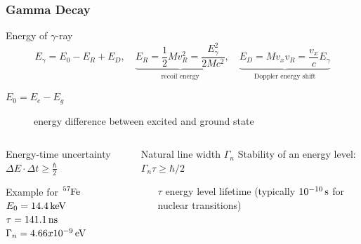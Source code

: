 	\begin{frame}
		\frametitle{Gamma Decay}
	
		\begin{block}{Energy of $\gamma$-ray}
			\fontsize{9.5pt}{12pt}
			\begin{equation*}
				E_{\gamma}=E_0-E_R+E_D, \quad \underbrace{E_R=\frac{1}{2}Mv_R^2=\frac{E_{\gamma}^2}{2Mc^2}}_{\text{recoil energy}}, \quad
				\underbrace{E_D=Mv_xv_R=\frac{v_x}{c}E_{\gamma}}_{\text{Doppler energy shift}}
			\end{equation*}
			\begin{description}
				\item [$E_0=E_e-E_g$] energy difference between excited and ground state
			\end{description}
		\end{block}
	
		\begin{columns}
			\begin{column}{0.4\linewidth}
				\begin{block}{Energy-time uncertainty}
					\centering
					$\Delta E \cdot \Delta t \geq \frac{\hbar}{2}$
				\end{block}
				\begin{block}{Example for $\ce{^{57}Fe}$}
					\centering
					$E_0=\unit[14.4]{keV}$\\
					$\tau=\unit[141.1]{ns}$\\
					$\Gamma_n=\unit[4.66 x 10^{-9}]{eV}$
				\end{block}
			\end{column}
			\begin{column}{0.55\linewidth}
				\begin{block}{Natural line width $\Gamma_n$}
					\centering
					Stability of an energy level: $\Gamma_n \tau \geq \hbar / 2$
					\begin{enumerate}
						\item[$\tau$] energy level lifetime (typically $\unit[10^{-10}]{s}$ for nuclear transitions)
					\end{enumerate}
				\end{block}
			\end{column}
		\end{columns}
	
	\end{frame}
	

